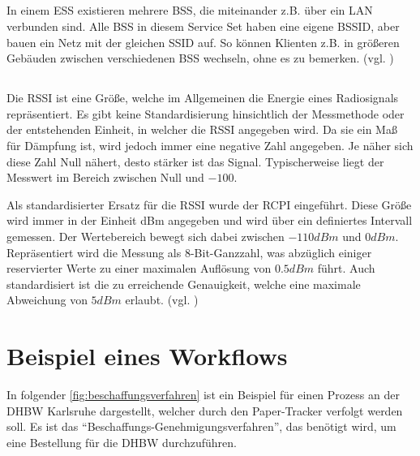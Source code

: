 \subsection{}

In einem \gls{ESS} existieren mehrere \gls{BSS}, die miteinander z.B. über ein \gls{LAN} verbunden sind.
Alle \gls{BSS} in diesem Service Set haben eine eigene \gls{BSSID}, aber bauen ein Netz mit der gleichen \gls{SSID} auf.
So können Klienten z.B. in größeren Gebäuden zwischen verschiedenen \gls{BSS} wechseln, ohne es zu bemerken.
(vgl. \cite{Haider2019})

\subsection{}

Die \gls{RSSI} ist eine Größe, welche im Allgemeinen die Energie eines Radiosignals repräsentiert.
Es gibt keine Standardisierung hinsichtlich der Messmethode oder der entstehenden Einheit, in
welcher die \gls{RSSI} angegeben wird. Da sie ein Maß für Dämpfung ist, wird jedoch immer eine
negative Zahl angegeben. Je näher sich diese Zahl Null nähert, desto stärker ist das Signal.
Typischerweise liegt der Messwert im Bereich zwischen Null und $-100$.

Als standardisierter Ersatz für die \gls{RSSI} wurde der \gls{RCPI} eingeführt. Diese Größe wird
immer in der Einheit dBm angegeben und wird über ein definiertes Intervall gemessen. Der
Wertebereich bewegt sich dabei zwischen $-110 dBm$ und $0 dBm$. Repräsentiert wird die Messung als
8-Bit-Ganzzahl, was abzüglich einiger reservierter Werte zu einer maximalen Auflösung von $0.5 dBm$
führt. Auch standardisiert ist die zu erreichende Genauigkeit, welche eine maximale Abweichung von
$5 dBm$ erlaubt. (vgl. \cite{IEEE802.11-2012})

\section{Beispiel eines Workflows}

In folgender \autoref{fig:beschaffungsverfahren} ist ein Beispiel für einen Prozess an der \gls{DHBW} Karlsruhe dargestellt,
welcher durch den Paper-Tracker verfolgt werden soll.
Es ist das \enquote{Beschaffungs-Genehmigungsverfahren}, das benötigt wird, um eine Bestellung für die \gls{DHBW} durchzuführen.

